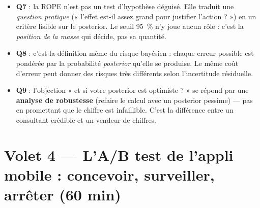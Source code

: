 \documentclass[11pt,a4paper]{article}
\begin{document}
\begin{piege}[Questions 7 à 9]
\begin{itemize}[leftmargin=4mm, itemsep=0.5mm]
  \item \textbf{Q7} : la ROPE n'est pas un test d'hypothèse déguisé. Elle
        traduit une \emph{question pratique} (« l'effet est-il assez grand
        pour justifier l'action ? ») en un critère lisible sur le posterior.
        Le seuil 95~\% n'y joue aucun rôle : c'est la \emph{position de la
        masse} qui décide, pas sa quantité.
  \item \textbf{Q8} : c'est la définition même du risque bayésien : chaque
        erreur possible est pondérée par la probabilité \emph{posterior}
        qu'elle se produise. Le même coût d'erreur peut donner des risques
        très différents selon l'incertitude résiduelle.
  \item \textbf{Q9} : l'objection « et si votre posterior est optimiste ? »
        se répond par une \textbf{analyse de robustesse} (refaire le calcul
        avec un posterior pessime) --- pas en promettant que le chiffre est
        infaillible. C'est la différence entre un consultant crédible et un
        vendeur de chiffres.
\end{itemize}
\end{piege}

\section{Volet 4 --- L'A/B test de l'appli mobile : concevoir, surveiller, arrêter (60 min)}
\end{document}
